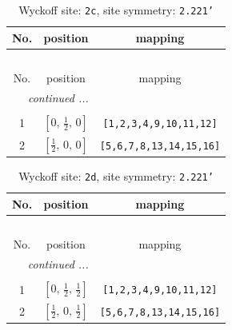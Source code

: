 \documentclass[fleqn,8pt]{jsarticle}
\begin{document}
\renewcommand{\arraystretch}{1.2}
\begin{longtable}{ccc}
\caption{Wyckoff site: {\tt 2c}, site symmetry: {\tt 2.221'}}
 \\
 \hline \hline
No. & position & mapping \\ \hline \endfirsthead

\multicolumn{2}{l}{\tablename\ \thetable{}} \\
 \hline \hline
No. & position & mapping \\ \hline \endhead

 \hline \hline
\multicolumn{2}{r}{\footnotesize\it continued ...} \\ \endfoot

 \hline \hline
\multicolumn{2}{r}{} \\ \endlastfoot

1 & $\left[ 0,\, \frac{1}{2},\, 0 \right]$ & {\tt [1,2,3,4,9,10,11,12]} \\ \hline
2 & $\left[ \frac{1}{2},\, 0,\, 0 \right]$ & {\tt [5,6,7,8,13,14,15,16]} \\
\end{longtable}
\renewcommand{\arraystretch}{1.2}
\begin{longtable}{ccc}
\caption{Wyckoff site: {\tt 2d}, site symmetry: {\tt 2.221'}}
 \\
 \hline \hline
No. & position & mapping \\ \hline \endfirsthead

\multicolumn{2}{l}{\tablename\ \thetable{}} \\
 \hline \hline
No. & position & mapping \\ \hline \endhead

 \hline \hline
\multicolumn{2}{r}{\footnotesize\it continued ...} \\ \endfoot

 \hline \hline
\multicolumn{2}{r}{} \\ \endlastfoot

1 & $\left[ 0,\, \frac{1}{2},\, \frac{1}{2} \right]$ & {\tt [1,2,3,4,9,10,11,12]} \\ \hline
2 & $\left[ \frac{1}{2},\, 0,\, \frac{1}{2} \right]$ & {\tt [5,6,7,8,13,14,15,16]} \\
\end{longtable}
\renewcommand{\arraystretch}{1.2}
\end{document}
